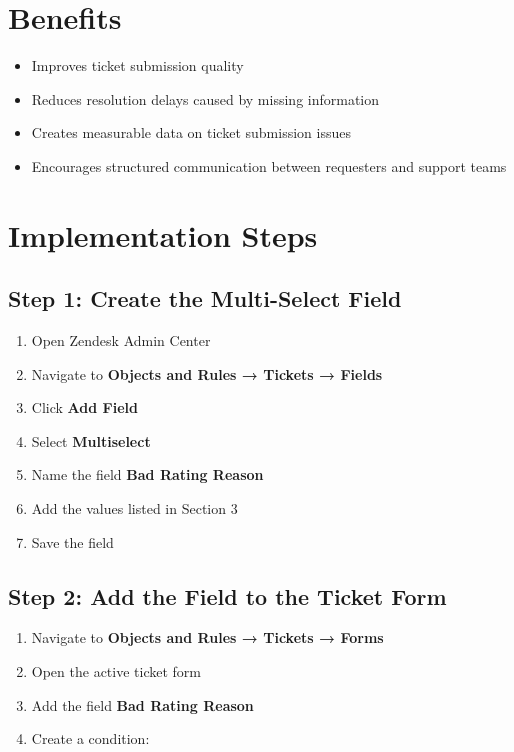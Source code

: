 \documentclass[11pt]{article}
\begin{document}
\section{Benefits}

\begin{itemize}
\item Improves ticket submission quality
\item Reduces resolution delays caused by missing information
\item Creates measurable data on ticket submission issues
\item Encourages structured communication between requesters and support teams
\end{itemize}

\section{Implementation Steps}

\subsection{Step 1: Create the Multi-Select Field}

\begin{enumerate}
\item Open Zendesk Admin Center
\item Navigate to \textbf{Objects and Rules → Tickets → Fields}
\item Click \textbf{Add Field}
\item Select \textbf{Multiselect}
\item Name the field \textbf{Bad Rating Reason}
\item Add the values listed in Section 3
\item Save the field
\end{enumerate}

\subsection{Step 2: Add the Field to the Ticket Form}

\begin{enumerate}
\item Navigate to \textbf{Objects and Rules → Tickets → Forms}
\item Open the active ticket form
\item Add the field \textbf{Bad Rating Reason}
\item Create a condition:
\end{enumerate}
\end{document}

